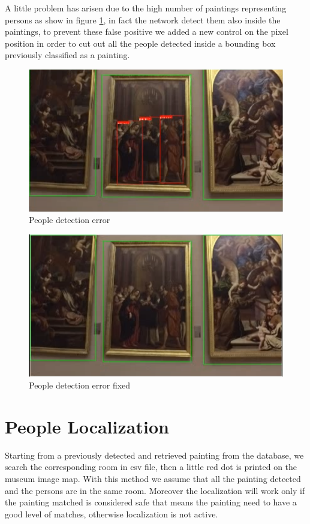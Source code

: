 \documentclass[conference]{IEEEtran}
\begin{document}
A little problem has arisen due to the high number of paintings representing persons as show in figure \ref{fig_People_detection_error}, in fact the network detect them also inside the paintings, to prevent these false positive we added a new control on the pixel position in order to cut out all the people detected inside a bounding box previously classified as a painting.

\begin{figure}[htbp]
\centerline{\includegraphics[width=0.8\columnwidth]{../people_detection/people_error.png}}
\caption{People detection error}
\label{fig_People_detection_error}
\end{figure}

\begin{figure}[htbp]
\centerline{\includegraphics[width=0.8\columnwidth]{../people_detection/people_error_fixed.png}}
\caption{People detection error fixed}
\label{fig_People_detection_error_fixed}
\end{figure}

\section{People Localization}
Starting from a previously detected and retrieved painting from the database, we search the corresponding room in csv file, then a little red dot is printed on the museum image map. With this method we assume that all the painting detected and the persons are in the same room.
Moreover the localization will work only if the painting matched is considered safe that means the painting need to have a good level of matches, otherwise localization is not active.\\
\end{document}
